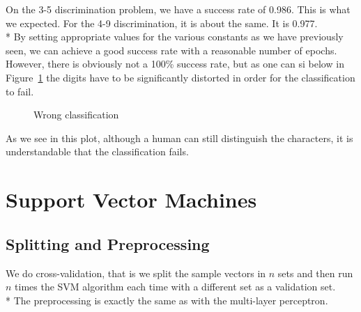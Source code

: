 \documentclass[10pt,a4paper,english]{article}
\begin{document}
On the 3-5 discrimination problem, we have a success rate of 0.986. This is what we expected. For the 4-9 discrimination, it is about the same. It is 0.977.\\*
By setting appropriate values for the various constants as we have previously seen, we can achieve a good success rate with a reasonable number of epochs. However, there is obviously not a 100\% success rate, but as one can si below in Figure~\ref{fig:wrongclass} the digits have to be significantly distorted in order for the classification to fail.

\begin{figure}[!h]
    \centering
    \caption{Wrong classification} 
    \label{fig:wrongclass}
\end{figure}

As we see in this plot, although a human can still distinguish the characters, it is understandable that the classification fails.

\section*{Support Vector Machines}

\subsection*{Splitting and Preprocessing}

We do cross-validation, that is we split the sample vectors in $ n $ sets and then run $ n $ times the SVM algorithm each time with a different set as a validation set.\\*
The preprocessing is exactly the same as with the multi-layer perceptron.
\end{document}
